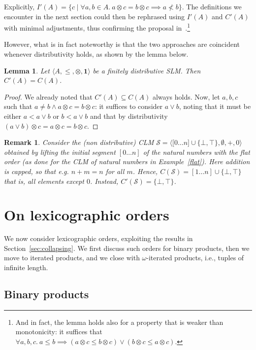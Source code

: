 \documentclass[a4paper]{elsarticle}
\newtheorem{remark}{Remark}
\newtheorem{lemma}{Lemma}
\newcommand{\monop}{\otimes}
\newcommand{\1}{\mathbf{1}}
\begin{document}
Explicitly, $I'(A) = \{ c \mid \forall a, b \in A.\ a \otimes c = b \otimes c \implies a \not < b \}$.
%
The definitions we encounter in the next section 
could then be rephrased using 
$I'(A)$ and $C'(A)$ with minimal adjustments, thus confirming the proposal
in~\cite{GadducciHMW13}.\footnote{And in fact, the lemma holds also for 
	a property that is weaker than monotonicity: it suffices that 
	$\forall a, b, c.\ a \leq b \implies (a \otimes c \leq b \otimes c) \vee (b \otimes c \leq a \otimes c)$.
}

However, what is in fact noteworthy is that the two approaches are coincident
whenever distributivity holds, as shown by the lemma below.

\begin{lemma}
	Let $\langle A, \leq, \monop, \1 \rangle$ be a finitely distributive SLM.
	Then $C'(A) = C(A)$.
\end{lemma}
\begin{proof}
	We already noted that $C'(A) \subseteq C(A)$ always holds. Now, let $a, b, c$ such that
	$a \neq b \wedge a \otimes c = b \otimes c$: it suffices to consider $a \vee b$, noting 
	that it must be either $a < a \vee b$ or $b < a \vee b$ and that by distributivity 
	$(a \vee b) \otimes c = a \otimes c = b \otimes c$.
\end{proof}

\begin{remark}
	Consider the (non distributive) CLM $\mathcal{S} = \langle \mathbb [0 \ldots n] \cup \{\bot,\top\}, \emptyset, +, 0 \rangle$ 
	obtained by lifting the initial segment $[0 \ldots n]$ of the natural numbers with the flat order (as done for
	the CLM of natural numbers in Example~\ref{flat}). Here addition is capped, so that 
	e.g. $n + m = n$ for all $m$. Hence, $C(\mathcal{S}) = [1 \ldots n] \cup \{\bot,\top\}$
	that is, all elements except $0$. Instead, $C'(\mathcal{S}) =  \{\bot,\top\}$.
\end{remark}

\section{On lexicographic orders}\label{sec:lexico}
We now consider lexicographic orders, exploiting the results in Section~\ref{sec:collapsing}.
%
We first discuss such orders for binary products, then we move to iterated products, 
and we close with $\omega$-iterated products, i.e., tuples of infinite length.

\subsection{Binary products}\label{sec:lexico}
\end{document}

